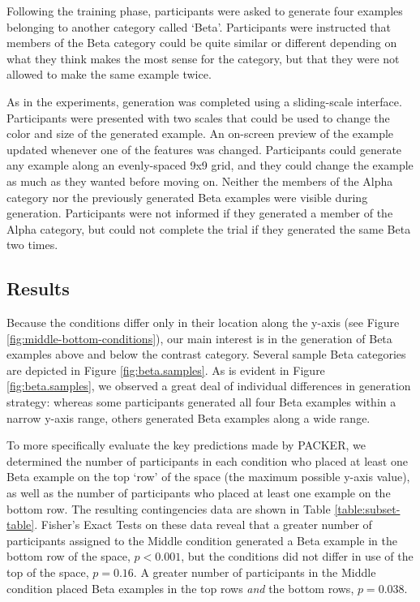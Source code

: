 \documentclass[10pt,letterpaper]{article}
\begin{document}
Following the training phase, participants were asked to generate four examples belonging to another category called `Beta'. Participants were instructed that members of the Beta category could be quite similar or different depending on what they think makes the most sense for the category, but that they were not allowed to make the same example twice. 

As in the \citet{jern2013probabilistic} experiments, generation was completed using a sliding-scale interface. Participants were presented with two scales that could be used to change the color and size of the generated example. An on-screen preview of the example updated whenever one of the features was changed. Participants could generate any example along an evenly-spaced 9x9 grid, and they could change the example as much as they wanted before moving on. Neither the members of the Alpha category nor the previously generated Beta examples were visible during generation. Participants were not informed if they generated a member of the Alpha category, but could not complete the trial if they generated the same Beta two times.




\subsection{Results}


Because the conditions differ only in their location along the y-axis (see Figure \ref{fig:middle-bottom-conditions}), our main interest is in the generation of Beta examples above and below the contrast category. Several sample Beta categories are depicted in Figure \ref{fig:beta.samples}. As is evident in Figure \ref{fig:beta.samples}, we observed a great deal of individual differences in generation strategy: whereas some participants generated all four Beta examples within a narrow y-axis range, others generated Beta examples along a wide range. 


To more specifically evaluate the key predictions made by PACKER, we determined the number of participants in each condition who placed at least one Beta example on the top `row' of the space (the maximum possible y-axis value), as well as the number of participants who placed at least one example on the bottom row. The resulting contingencies data are shown in Table \ref{table:subset-table}. Fisher's Exact Tests on these data reveal that a greater number of participants assigned to the Middle condition generated a Beta example in the bottom row of the space, $p < 0.001$, but the conditions did not differ in use of the top of the space, $p = 0.16$. A greater number of participants in the Middle condition placed Beta examples in the top rows \textit{and} the bottom rows, $p = 0.038$. 
\end{document}
